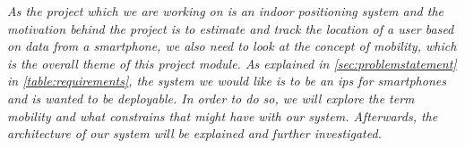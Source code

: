 \textit{As the project which we are working on is an indoor positioning system and the motivation behind the project is to estimate and track the location of a user based on data from a smartphone, we also need to look at the concept of mobility, which is the overall theme of this project module. As explained in \autoref{sec:problemstatement} in \autoref{table:requirements}, the system we would like is to be an \gls{ips} for smartphones and is wanted to be deployable.  
In order to do so, we will explore the term mobility and what constrains that might have with our system. Afterwards, the architecture of our system will be explained and further investigated.}